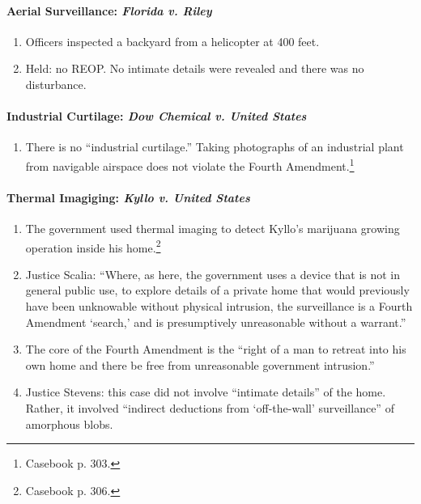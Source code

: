 \paragraph{Aerial Surveillance: \emph{Florida v. Riley}}

\begin{enumerate}
    \item Officers inspected a backyard from a helicopter at 400 feet.
    \item Held: no REOP. No intimate details were revealed and there was no 
    disturbance.
\end{enumerate}

\paragraph{Industrial Curtilage: \emph{Dow Chemical v. United States}}

\begin{enumerate}
    \item There is no ``industrial curtilage.'' Taking photographs of an 
    industrial plant from navigable airspace does not violate the Fourth 
    Amendment.\footnote{Casebook p. 303.}
\end{enumerate}

\paragraph{Thermal Imagiging: \emph{Kyllo v. United States}}

\begin{enumerate}
    \item The government used thermal imaging to detect Kyllo's marijuana 
    growing operation inside his home.\footnote{Casebook p. 306.}
    \item Justice Scalia: ``Where, as here, the government uses a device that 
    is not in general public use, to explore details of a private home that 
    would previously have been unknowable without physical intrusion, the 
    surveillance is a Fourth Amendment `search,' and is presumptively 
    unreasonable without a warrant.''
    \item The core of the Fourth Amendment is the ``right of a man to retreat 
    into his own home and there be free from unreasonable government 
    intrusion.''
    \item Justice Stevens: this case did not involve ``intimate details'' of the 
    home. Rather, it involved \enquote{indirect deductions from `off-the-wall' 
    surveillance} of amorphous blobs.
\end{enumerate}

